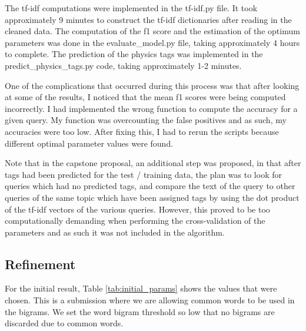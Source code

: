 \documentclass{article}
\begin{document}
The tf-idf computations were implemented in the tf-idf.py file. It took
approximately 9 minutes to construct the tf-idf dictionaries after reading in
the cleaned data. The computation of the f1 score and the estimation of the
optimum parameters was done in the evaluate\_model.py file, taking
approximately 4 hours to complete. The prediction of the physics tags was
implemented in the predict\_physics\_tags.py code, taking approximately 1-2
minutes.

One of the complications that occurred during this process was that after
looking at some of the results, I noticed that the mean f1 scores were being
computed incorrectly. I had implemented the wrong function to compute the
accuracy for a given query. My function was overcounting the false positives
and as such, my accuracies were too low. After fixing this, I had to rerun the
scripts because different optimal parameter values were found. 

Note that in the capstone proposal, an additional step was proposed, in that
after tags had been predicted for the test / training data, the plan was to
look for queries which had no predicted tags, and compare the text of the
query to other queries of the same topic which have been assigned tags by
using the dot product of the tf-idf vectors of the various queries. However,
this proved to be too computationally demanding when performing the
cross-validation of the parameters and as such it was not included in the
algorithm.



\subsection{Refinement}

For the initial result, Table \ref{tab:initial_params} shows the values that
were chosen. This is a submission where we are allowing common words to be
used in the bigrams. We set the word bigram threshold so low that no bigrams
are discarded due to common words.
\end{document}

